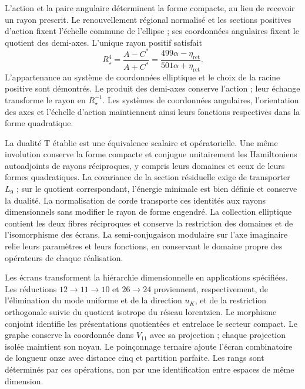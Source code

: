 L’action et la paire angulaire déterminent la forme compacte, au lieu de
recevoir un rayon prescrit. Le renouvellement régional normalisé et les
sections positives d’action fixent l’échelle commune de l’ellipse ;
ses coordonnées angulaires fixent le quotient des demi-axes. L’unique rayon
positif satisfait
\[
 R_\star^4=\frac{A-C^*}{A+C^*}
 =\frac{499\alpha-\eta_{\mathrm{ret}}}{501\alpha+\eta_{\mathrm{ret}}}.
\]
L’appartenance au système de coordonnées elliptique et le choix de la racine positive
sont démontrés. Le produit des demi-axes conserve l’action ;
leur échange transforme le rayon en \(R_\star^{-1}\).
Les systèmes de coordonnées angulaires, l’orientation des axes et l’échelle d’action
maintiennent ainsi leurs fonctions respectives dans la forme quadratique.

La dualité T établie est une équivalence scalaire et opératorielle.
Une même involution conserve la forme compacte et conjugue unitairement
les Hamiltoniens autoadjoints de rayons réciproques, y compris leurs
domaines et ceux de leurs formes quadratiques. La covariance de la section
résiduelle exige de transporter \(L_9\) ; sur le quotient correspondant,
l’énergie minimale est bien définie et conserve la dualité.
La normalisation de corde transporte ces identités aux rayons
dimensionnels sans modifier le rayon de forme engendré. La collection
elliptique contient les deux fibres réciproques et conserve la restriction
des domaines et de l’isomorphisme des écrans. La semi-conjugaison
modulaire sur l’axe imaginaire relie leurs paramètres et leurs fonctions,
en conservant le domaine propre des opérateurs de chaque réalisation.

Les écrans transforment la hiérarchie dimensionnelle en applications
spécifiées. Les réductions \(12\to11\to10\) et \(26\to24\)
proviennent, respectivement, de l’élimination du mode uniforme et de la
direction \(u_K\), et de la restriction orthogonale suivie du quotient
isotrope du réseau lorentzien. Le morphisme conjoint identifie
les présentations quotientées et entrelace le secteur compact.
Le graphe conserve la coordonnée dans \(V_{11}\) avec sa projection ;
chaque projection isolée maintient son noyau. Le poinçonnage ternaire
ajoute l’écran combinatoire de longueur onze avec distance cinq
et partition parfaite. Les rangs sont déterminés par ces
opérations, non par une identification entre espaces de même
dimension.

